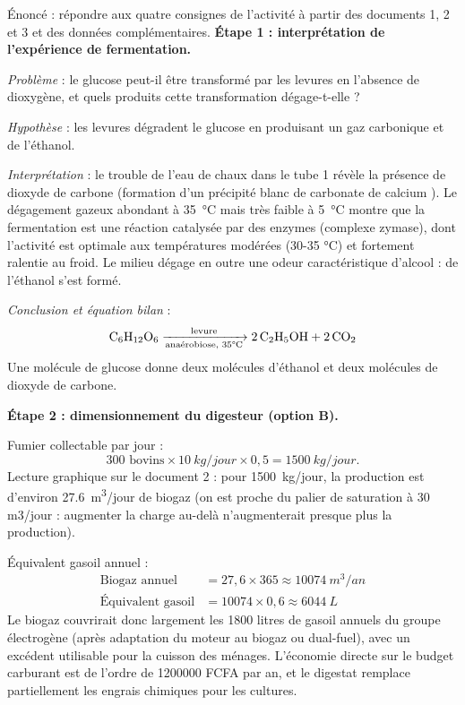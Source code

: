 \documentclass[11pt]{article}
\begin{document}
\begin{exoresolu}
Énoncé : répondre aux quatre consignes de l'activité à partir des documents 1, 2 et 3 et des données complémentaires.
\tcblower
\textbf{Étape 1 : interprétation de l'expérience de fermentation.}

\emph{Problème} : le glucose peut-il être transformé par les levures en l'absence de dioxygène, et quels produits cette transformation dégage-t-elle ?

\emph{Hypothèse} : les levures dégradent le glucose en produisant un gaz carbonique et de l'éthanol.

\emph{Interprétation} : le trouble de l'eau de chaux dans le tube 1 révèle la présence de dioxyde de carbone  (formation d'un précipité blanc de carbonate de calcium ). Le dégagement gazeux abondant à \SI{35}{\celsius} mais très faible à \SI{5}{\celsius} montre que la fermentation est une réaction catalysée par des enzymes (complexe zymase), dont l'activité est optimale aux températures modérées (30-35 °C) et fortement ralentie au froid. Le milieu dégage en outre une odeur caractéristique d'alcool : de l'éthanol s'est formé.

\emph{Conclusion et équation bilan} :
\[ \ce{C6H12O6 ->[levure][\text{anaérobiose, 35°C}] 2 C2H5OH + 2 CO2} \]
Une molécule de glucose donne deux molécules d'éthanol et deux molécules de dioxyde de carbone.

\textbf{Étape 2 : dimensionnement du digesteur (option B).}

Fumier collectable par jour :
\[ 300 \text{ bovins} \times \SI{10}{kg/jour} \times 0{,}5 = \SI{1500}{kg/jour}. \]
Lecture graphique sur le document 2 : pour \SI{1500}{kg/jour}, la production est d'environ \SI{27,6}{m^3/jour} de biogaz (on est proche du palier de saturation à 30 m3/jour : augmenter la charge au-delà n'augmenterait presque plus la production).

Équivalent gasoil annuel :
\begin{align*}
\text{Biogaz annuel} &= 27{,}6 \times 365 \approx \SI{10074}{m^3/an} \\
\text{Équivalent gasoil} &= 10074 \times 0{,}6 \approx \SI{6044}{L}
\end{align*}
Le biogaz couvrirait donc largement les \num{1800} litres de gasoil annuels du groupe électrogène (après adaptation du moteur au biogaz ou dual-fuel), avec un excédent utilisable pour la cuisson des ménages. L'économie directe sur le budget carburant est de l'ordre de \num{1200000} FCFA par an, et le digestat remplace partiellement les engrais chimiques pour les cultures.


\end{exoresolu}
\end{document}
